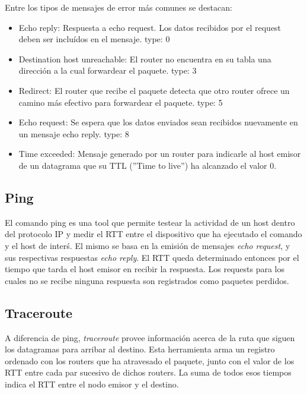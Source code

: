 Entre los tipos de mensajes de error m\'as comunes se destacan:
\begin{itemize}
  \item Echo reply: Respuesta a echo request. Los datos recibidos por el request deben ser inclu\'idos
  en el mensaje. type: 0
  \item Destination host unreachable: El router no encuentra en su tabla una direcci\'on a la cual
  forwardear el paquete. type: 3
  \item Redirect: El router que recibe el paquete detecta que otro router ofrece un camino m\'as
  efectivo para forwardear el paquete. type: 5
  \item Echo request: Se espera que los datos enviados sean recibidos nuevamente en un mensaje echo
  reply. type: 8
  \item Time exceeded: Mensaje generado por un router para indicarle al host emisor de un datagrama
  que su TTL (''Time to live'') ha alcanzado el valor 0.

\end{itemize}


\subsection{Ping}

El comando ping es una tool que permite testear la actividad de un host dentro del protocolo IP y medir
el RTT entre el dispositivo que ha ejecutado el comando y el host de inter\'s. El mismo se basa en
la emisi\'on de mensajes \emph{echo request}, y sus respectivas respuestas \emph{echo reply}. El RTT queda
determinado entonces por el tiempo que tarda el host emisor en recibir la respuesta.
Los requests para los cuales no se recibe ninguna respuesta son registrados como paquetes perdidos.

\subsection{Traceroute}

A diferencia de ping, \emph{traceroute} provee informaci\'on acerca de la ruta que siguen los datagramas
para arribar al destino. Esta herramienta arma un registro ordenado con los routers que ha atravesado
el paquete, junto con el valor de los RTT entre cada par sucesivo de dichos routers. La suma de todos
esos tiempos indica el RTT entre el nodo emisor y el destino.
